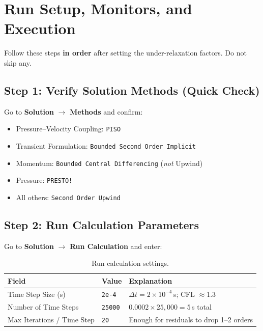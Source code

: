 \documentclass[12pt,a4paper]{report}
\begin{document}
\chapter{Run Setup, Monitors, and Execution}
\label{ch:run}

Follow these steps \textbf{in order} after setting the under-relaxation
factors.  Do not skip any.

\section{Step 1: Verify Solution Methods (Quick Check)}

Go to \textbf{Solution} $\rightarrow$ \textbf{Methods} and confirm:

\begin{itemize}
  \item Pressure--Velocity Coupling: \texttt{PISO}
  \item Transient Formulation: \texttt{Bounded Second Order Implicit}
  \item Momentum: \texttt{Bounded Central Differencing} (\emph{not}
        Upwind)
  \item Pressure: \texttt{PRESTO!}
  \item All others: \texttt{Second Order Upwind}
\end{itemize}

\noindent{}

\section{Step 2: Run Calculation Parameters}

Go to \textbf{Solution} $\rightarrow$ \textbf{Run Calculation} and
enter:

\begin{table}[H]
\centering
\caption{Run calculation settings.}
\label{tab:transient}
\begin{tabular}{@{}lll@{}}
\toprule
\textbf{Field} & \textbf{Value} & \textbf{Explanation} \\
\midrule
Time Step Size (s)          & \texttt{2e-4}  & $\Delta t = 2\times10^{-4}$\,s; CFL $\approx 1.3$ \\
Number of Time Steps        & \texttt{25000} & $0.0002 \times 25{,}000 = 5$\,s total \\
Max Iterations / Time Step  & \texttt{20}    & Enough for residuals to drop 1--2 orders \\
\bottomrule
\end{tabular}
\end{table}
\end{document}

